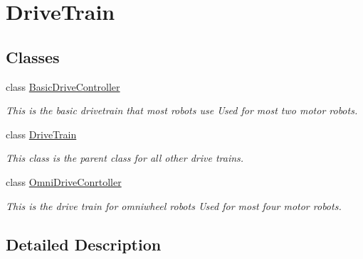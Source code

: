 \hypertarget{group___drive_train}{}\section{Drive\+Train}
\label{group___drive_train}
\subsection*{Classes}
\begin{DoxyCompactItemize}
\item 
class \mbox{\hyperlink{class_basic_drive_controller}{Basic\+Drive\+Controller}}
\begin{DoxyCompactList}\small\item\em This is the basic drivetrain that most robots use Used for most two motor robots. \end{DoxyCompactList}\item 
class \mbox{\hyperlink{class_drive_train}{Drive\+Train}}
\begin{DoxyCompactList}\small\item\em This class is the parent class for all other drive trains. \end{DoxyCompactList}\item 
class \mbox{\hyperlink{class_omni_drive_conrtoller}{Omni\+Drive\+Conrtoller}}
\begin{DoxyCompactList}\small\item\em This is the drive train for omniwheel robots Used for most four motor robots. \end{DoxyCompactList}\end{DoxyCompactItemize}


\subsection{Detailed Description}
